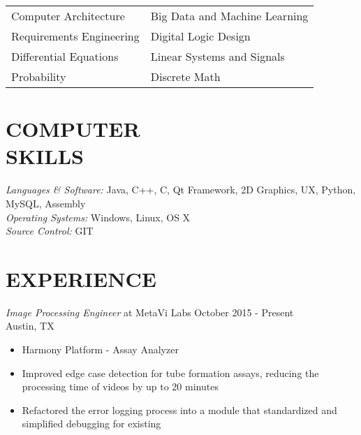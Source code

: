 \documentclass[line,margin]{res}
\begin{document}
\begin{resume}
\begin{tabularx}{\textwidth}{@{}XX@{}}
                  Computer Architecture & Big Data and Machine Learning\\

                  Requirements Engineering & Digital Logic Design \\

                  Differential Equations & Linear Systems and Signals \\

                  Probability & Discrete Math \\

                \end{tabularx}


                


                
 
\section{COMPUTER \\ SKILLS} {\sl Languages \& Software:} Java, C++, C, Qt Framework, 2D Graphics, UX, Python, MySQL, Assembly \\
        {\sl Operating Systems:} Windows, Linux, OS X \\
        {\sl Source Control:} GIT
 
        \section{EXPERIENCE} {\sl Image Processing Engineer} at MetaVi Labs \hfill October 2015 - Present \\
        Austin, TX 


        \begin{itemize}  \itemsep -2pt %
        \item         Harmony Platform - Assay Analyzer 
                \item Improved edge case detection for tube formation assays, reducing the processing time of videos by up to 20 minutes
                \item Refactored the error logging process into a module that standardized and simplified debugging for existing
                \end{itemize}
                

\end{resume}
\end{document}
